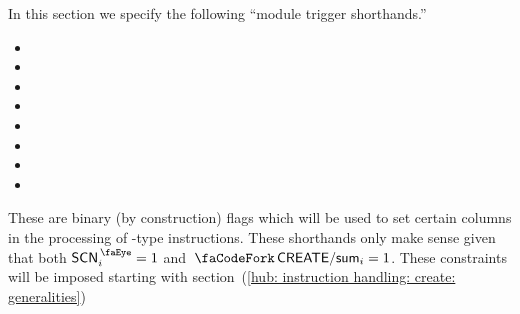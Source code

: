 In this section we specify the following ``module trigger shorthands.''
\begin{multicols}{2}
\begin{itemize}
	\item \locTriggerMxp{}
	\item \locTriggerStp{}
	\item \locTriggerOob{}
	\item \locTriggerMmu{}
	\item \locTriggerHashInfo{}
	\item \locTriggerRlpAddr{}
	\item \locTriggerRomLex{}
	\item[\vspace{\fill}]
\end{itemize}
\end{multicols}
\noindent These are binary (by construction) flags which will be used to set certain columns in the processing of -type instructions.
\saNote{} These shorthands only make sense given that both $\peekScenario_{i} = 1$ and $\scenCreateSum_{i} = 1$. These constraints will be imposed starting with section~(\ref{hub: instruction handling: create: generalities})

